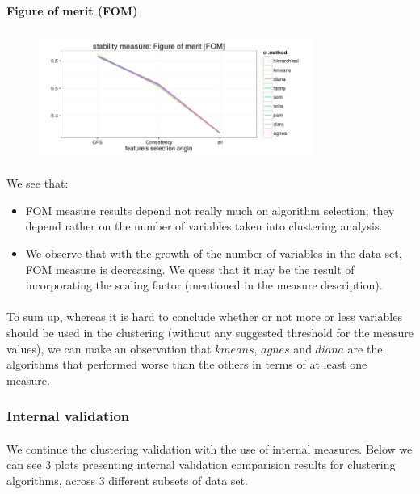 \documentclass[10pt]{article}\usepackage[]{graphicx}\usepackage[]{color}
\begin{document}
\paragraph{Figure of merit (FOM)} 
\begin{figure}[h!]
\centering
\includegraphics[width=0.8\textwidth]{Plots2/comp1-fom.png}
\end{figure}
\paragraph{} 
We see that:
\begin{itemize}
\item FOM measure results depend not really much on algorithm selection; they depend 
rather on the number of variables taken into clustering analysis.
\item We observe that with the growth of the number of variables in the data set,
FOM measure is decreasing. We quess that it may be the result of incorporating
the scaling factor (mentioned in the measure description).
\end{itemize}

\paragraph{}
To sum up, whereas it is hard to conclude whether or not more or less variables
should be used in the clustering (without any suggested threshold for the measure values), we can make an observation that $kmeans$, $agnes$ and $diana$ are the algorithms
that performed worse than the others in terms of at least one measure.



\subsubsection{Internal validation}
\paragraph{}
We continue the clustering validation with the use of internal measures.
Below we can see 3 plots presenting internal validation comparision results 
for clustering algorithms, across 3 different subsets of data set. 
\end{document}
